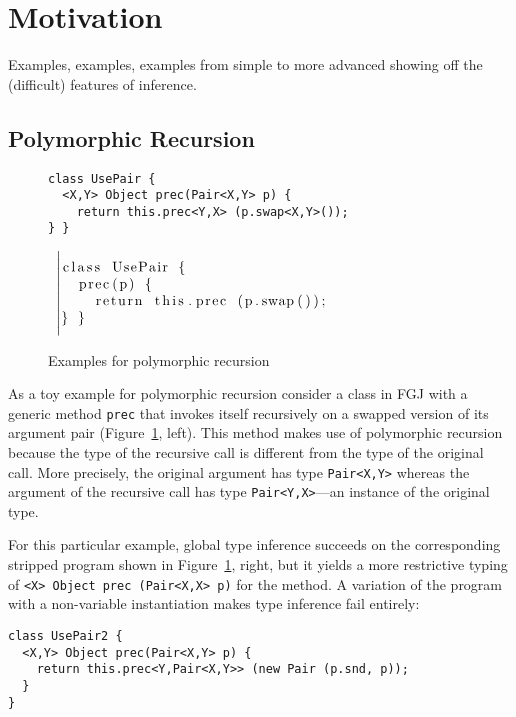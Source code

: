 \section{Motivation}
\label{sec:motivation}

Examples, examples, examples from simple to more advanced showing off
the (difficult) features of inference.

\subsection{Polymorphic Recursion}
\label{sec:polym-recurs}
\begin{figure}[tp]
  \begin{minipage}{0.5\linewidth}
\begin{lstlisting}
class UsePair {
  <X,Y> Object prec(Pair<X,Y> p) {
    return this.prec<Y,X> (p.swap<X,Y>());
} }
\end{lstlisting}
  \end{minipage}
  ~$\left|
  \begin{minipage}{0.48\linewidth}
\begin{lstlisting}
class UsePair {
  prec(p) {
    return this.prec (p.swap());

} }
\end{lstlisting}
  \end{minipage}\right.$
  \caption{Examples for polymorphic recursion}
  \label{fig:examples-poly-rec}
\end{figure}

As a toy example for polymorphic recursion consider a class in FGJ with a
generic method \texttt{prec} that invokes itself
recursively on a swapped version of its argument pair
(Figure~\ref{fig:examples-poly-rec}, left).
This method makes use of polymorphic recursion because the type of the
recursive call is different from the type of the original call. More
precisely, the original argument has type \texttt{Pair<X,Y>} whereas
the argument of the recursive call has type
\texttt{Pair<Y,X>}---an instance of the original type.

For this particular example, global type inference succeeds on the
corresponding stripped program shown in
Figure~\ref{fig:examples-poly-rec}, right, but it yields a more restrictive
typing of \texttt{<X> Object prec (Pair<X,X> p)} for the method. 
A variation of the program with a non-variable instantiation makes type inference fail entirely:
\begin{lstlisting}
class UsePair2 {
  <X,Y> Object prec(Pair<X,Y> p) {
    return this.prec<Y,Pair<X,Y>> (new Pair (p.snd, p));
  }
}
\end{lstlisting}



